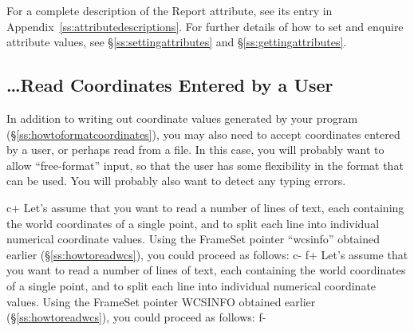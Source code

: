 \documentclass[twoside,11pt]{starlink}
\providecommand{\appref}[1]{Appendix~\ref{#1}}
\providecommand{\secref}[1]{\S\ref{#1}}
\begin{document}
For a complete description of the Report attribute, see its entry in
\appref{ss:attributedescriptions}.  For further details of how to set
and enquire attribute values, see \secref{ss:settingattributes} and
\secref{ss:gettingattributes}.

\subsection{\ldots Read Coordinates Entered by a User}

In addition to writing out coordinate values generated by your program
(\secref{ss:howtoformatcoordinates}), you may also need to accept
coordinates entered by a user, or perhaps read from a file. In this
case, you will probably want to allow ``free-format'' input, so that
the user has some flexibility in the format that can be used. You will
probably also want to detect any typing errors.

c+
Let's assume that you want to read a number of lines of text, each
containing the world coordinates of a single point, and to split each
line into individual numerical coordinate values. Using the FrameSet
pointer ``wcsinfo'' obtained earlier (\secref{ss:howtoreadwcs}), you
could proceed as follows:
c-
f+
Let's assume that you want to read a number of lines of text, each
containing the world coordinates of a single point, and to split each
line into individual numerical coordinate values. Using the FrameSet
pointer WCSINFO obtained earlier (\secref{ss:howtoreadwcs}), you could
proceed as follows:
f-
\end{document}
